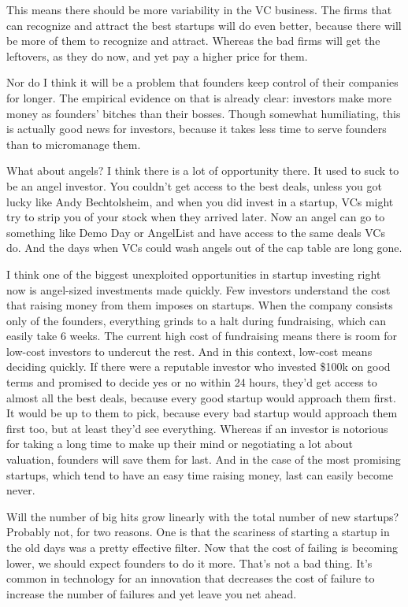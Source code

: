 This means there should be more variability in the VC business. The
firms that can recognize and attract the best startups will do even
better, because there will be more of them to recognize and attract.
Whereas the bad firms will get the leftovers, as they do now, and yet
pay a higher price for them.

Nor do I think it will be a problem that founders keep control of their
companies for longer. The empirical evidence on that is already clear:
investors make more money as founders' bitches than their bosses. Though
somewhat humiliating, this is actually good news for investors, because
it takes less time to serve founders than to micromanage them.

What about angels? I think there is a lot of opportunity there. It used
to suck to be an angel investor. You couldn't get access to the best
deals, unless you got lucky like Andy Bechtolsheim, and when you did
invest in a startup, VCs might try to strip you of your stock when they
arrived later. Now an angel can go to something like Demo Day or
AngelList and have access to the same deals VCs do. And the days when
VCs could wash angels out of the cap table are long gone.

I think one of the biggest unexploited opportunities in startup
investing right now is angel-sized investments made quickly. Few
investors understand the cost that raising money from them imposes on
startups. When the company consists only of the founders, everything
grinds to a halt during fundraising, which can easily take 6 weeks. The
current high cost of fundraising means there is room for low-cost
investors to undercut the rest. And in this context, low-cost means
deciding quickly. If there were a reputable investor who invested \$100k
on good terms and promised to decide yes or no within 24 hours, they'd
get access to almost all the best deals, because every good startup
would approach them first. It would be up to them to pick, because every
bad startup would approach them first too, but at least they'd see
everything. Whereas if an investor is notorious for taking a long time
to make up their mind or negotiating a lot about valuation, founders
will save them for last. And in the case of the most promising startups,
which tend to have an easy time raising money, last can easily become
never.

Will the number of big hits grow linearly with the total number of new
startups? Probably not, for two reasons. One is that the scariness of
starting a startup in the old days was a pretty effective filter. Now
that the cost of failing is becoming lower, we should expect founders to
do it more. That's not a bad thing. It's common in technology for an
innovation that decreases the cost of failure to increase the number of
failures and yet leave you net ahead.

